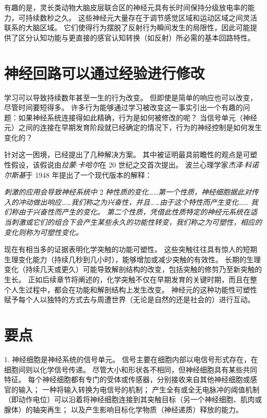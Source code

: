 有趣的是，灵长类动物大脑皮层联合区的神经元具有长时间保持分级放电率的能力，可持续数秒之久。
这些神经元大量存在于调节感觉区域和运动区域之间灵活联系的大脑区域。
它们使得行为摆脱了反射行为瞬间发生的局限性，因此可能提供了区分认知功能与更直接的感官认知转换（如反射）所必需的基本回路特性。


\section{神经回路可以通过经验进行修改}
学习可以导致持续数年甚至一生的行为改变。 
但即使是简单的响应也可以改变，尽管时间要短得多。 
许多行为能够通过学习被改变这一事实引出一个有趣的问题：如果神经系统连接得如此精确，行为是如何被修改的呢？ 
当信号单元（神经元）之间的连接在早期发育阶段就已经确定的情况下，行为的神经控制是如何发生变化的？


针对这一困境，已经提出了几种解决方案。 
其中被证明最具前瞻性的观点是可塑性假设，该假说由\textit{拉蒙$\cdot$卡哈尔}在 20 世纪之交首次提出。 
波兰心理学家\textit{杰泽$\cdot$科诺尔斯基}于 1948 年提出了一个现代版本的解释：

\vspace{0.4cm}
\noindent\textit{刺激的应用会导致神经系统中} 2 \textit{种性质的变化……第一个性质，神经细胞据此对传入的冲动做出响应……我们称之为兴奋性，并且……由于这个特性而产生变化…… 我们称由于兴奋性而产生的变化。
第二个性质，凭借此性质特定的神经元系统在适当刺激或它们的组合下会产生某些永久的功能性转变，我们称之为可塑性，相应的变化则称为可塑性变化。}
\vspace{0.4cm}

现在有相当多的证据表明化学突触的功能可塑性。 
这些突触往往具有惊人的短期生理变化能力（持续几秒到几小时），能够增加或减少突触的有效性。 
长期的生理变化（持续几天或更久）可能导致解剖结构的改变，包括突触的修剪乃至新突触的生长。 
正如后续章节将阐述的，化学突触不仅在早期发育的关键时期，而且在整个人生过程中，都会在功能和解剖结构上发生改变。
神经元的这种功能性可塑性赋予每个人以独特的方式去与周遭世界（无论是自然的还是社会的）进行互动。



\section{要点}
1. 神经细胞是神经系统的信号单元。
信号主要在细胞内部以电信号形式存在，在细胞间则以化学信号传递。
尽管大小和形状各不相同，但神经细胞具有某些共同特征。
每个神经细胞都有专门的受体或传感器，分别接收来自其他神经细胞或感官的输入； 
一种将输入转换为电信号的机制；
产生全有或全无电脉冲的阈值机制（即动作电位）可以沿着将神经细胞连接到其突触目标（另一个神经细胞、肌肉或腺体）的轴突再生；
以及产生影响目标化学物质（神经递质）释放的能力。



